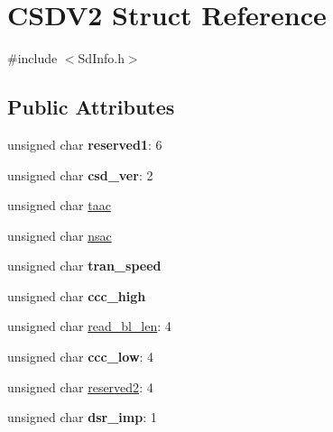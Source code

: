 \hypertarget{struct_c_s_d_v2}{}\section{C\+S\+D\+V2 Struct Reference}
\label{struct_c_s_d_v2}


{\ttfamily \#include $<$Sd\+Info.\+h$>$}

\subsection*{Public Attributes}
\begin{DoxyCompactItemize}
\item 
unsigned char {\bfseries reserved1}\+: 6\hypertarget{struct_c_s_d_v2_a2403be1c47bc762aa1a0cc0cc70ed766}{}\label{struct_c_s_d_v2_a2403be1c47bc762aa1a0cc0cc70ed766}

\item 
unsigned char {\bfseries csd\+\_\+ver}\+: 2\hypertarget{struct_c_s_d_v2_a2d6789ba630dbb1732806ff527188f72}{}\label{struct_c_s_d_v2_a2d6789ba630dbb1732806ff527188f72}

\item 
unsigned char \hyperlink{struct_c_s_d_v2_aba414a2887ea57a9715e17b3bb4f6030}{taac}
\item 
unsigned char \hyperlink{struct_c_s_d_v2_aa94bece488dd8683b532069d97d8b764}{nsac}
\item 
unsigned char {\bfseries tran\+\_\+speed}\hypertarget{struct_c_s_d_v2_a0442dc542c769ea0b0dba63127958bd9}{}\label{struct_c_s_d_v2_a0442dc542c769ea0b0dba63127958bd9}

\item 
unsigned char {\bfseries ccc\+\_\+high}\hypertarget{struct_c_s_d_v2_a10655e27874c467c7d93b75342b23ebf}{}\label{struct_c_s_d_v2_a10655e27874c467c7d93b75342b23ebf}

\item 
unsigned char \hyperlink{struct_c_s_d_v2_a660d402b75b24435ebc73863dabaa176}{read\+\_\+bl\+\_\+len}\+: 4
\item 
unsigned char {\bfseries ccc\+\_\+low}\+: 4\hypertarget{struct_c_s_d_v2_a550cac901699b824b861852136fc4747}{}\label{struct_c_s_d_v2_a550cac901699b824b861852136fc4747}

\item 
unsigned char \hyperlink{struct_c_s_d_v2_a01c91890e37265b96efa7cd3bde25d2c}{reserved2}\+: 4
\item 
unsigned char {\bfseries dsr\+\_\+imp}\+: 1\hypertarget{struct_c_s_d_v2_a16e521025f7277d53eeaf7ab576dd692}{}\label{struct_c_s_d_v2_a16e521025f7277d53eeaf7ab576dd692}


\end{DoxyCompactItemize}
